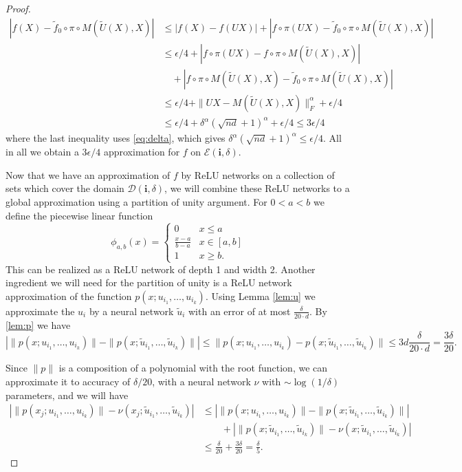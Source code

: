 \documentclass[twoside,11pt]{article}
\begin{document}
\begin{proof}
\begin{align*}
|f(X)-\tilde f_0 \circ \pi \circ M(\tilde U(X), X)|&\leq |f(X)-f(UX)|+|f\circ \pi (UX)-\tilde f_0 \circ \pi \circ M(\tilde U(X), X)|\\
&\leq \epsilon/4+|f\circ \pi (UX)-f \circ \pi \circ M(\tilde U(X), X)|\\
& \quad +|f\circ \pi \circ M(\tilde U(X), X)-\tilde f_0\circ \pi \circ M(\tilde U(X), X)|\\
&\leq \epsilon/4+\|UX-M(\tilde U(X),X) \|_F^\alpha+\epsilon/4\\
&\leq \epsilon/4+\delta^\alpha (\sqrt{nd}+1)^\alpha+\epsilon/4\leq 3\epsilon/4
\end{align*}
where the last inequality uses \eqref{eq:delta}, which gives $\delta^\alpha(\sqrt{nd}+1)^\alpha\leq \epsilon/4$. All in all we obtain a $3\epsilon/4$ approximation for $f$ on $\mathcal{E}(\mathbf{i},\delta) $. 

Now that we have an approximation of $f$ by ReLU networks on a collection of sets which cover the domain $\mathcal{D}(\mathbf{i},\delta)$, we will combine these ReLU networks to a global approximation using a partition of unity argument. For $0<a<b$ we define the piecewise linear function 
\begin{equation}
		\phi_{a,b}(x) = \begin{cases}
			0 &  x \leq a\\
			\frac{x-a}{b-a} & x\in [a,b]\\
			1 & x \geq  b.
		\end{cases}
	\end{equation}
This can be realized as a ReLU network of depth 1 and width 2.  Another ingredient we will need for the partition of unity is a ReLU network approximation of the function $p(x;u_{i_1},\ldots,u_{i_k}) $. Using Lemma \ref{lem:u} we approximate the $u_i$ by a neural network $\tilde u_i$ with an error of at most $\frac{\delta}{20\cdot d}$. By \ref{lem:p} we have 
$$| \|p(x;u_{i_1},\ldots,u_{i_k})\|-\|p(x;\tilde{u}_{i_1},\ldots,\tilde{u}_{i_k})\| | \leq \|p(x;u_{i_1},\ldots,u_{i_k})-p(x;\tilde{u}_{i_1},\ldots,\tilde{u}_{i_k})\|\leq 3d \frac{\delta}{20\cdot d}=\frac{3\delta}{20}.$$ 

Since $\|p\|$ is a composition of a polynomial with the root function, we can approximate it  to accuracy of  $\delta/20$, with a neural network $\nu$ with $\sim \log(1/\delta)$ parameters, and we will have 
\begin{align*}| \|p(x_j;u_{i_1},\ldots,u_{i_k})\|-\nu(x_j;\tilde u_{i_1},\ldots,\tilde u_{i_k})|&\leq | \|p(x;u_{i_1},\ldots,u_{i_k})\|-\|p(x;\tilde{u}_{i_1},\ldots,\tilde{u}_{i_k})\| |\\
& \quad \quad +| \|p(x;\tilde{u}_{i_1},\ldots,\tilde{u}_{i_k})\|-\nu(x;\tilde{u}_{i_1},\ldots,\tilde{u}_{i_k}) |  \\
&\leq \frac{\delta}{20}+\frac{3\delta}{20}=\frac{\delta}{5} . 
\end{align*}



\end{proof}
\end{document}
